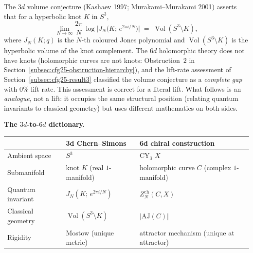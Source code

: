 The $3d$ volume conjecture (Kashaev 1997; Murakami--Murakami 2001) asserts that
for a hyperbolic knot $K$ in $S^3$,
\begin{equation}\label{eq:3d-volume-conjecture}
\lim_{N \to \infty} \frac{2\pi}{N}\,
 \log\bigl| J_N\!\bigl(K;\, e^{2\pi i / N}\bigr)\bigr|
 \;=\; \operatorname{Vol}(S^3 \setminus K),
\end{equation}
where $J_N(K; q)$ is the $N$-th coloured Jones polynomial and
$\operatorname{Vol}(S^3 \setminus K)$ is the hyperbolic volume of the
knot complement. The $6d$ holomorphic theory does not have knots
(holomorphic curves are not knots: Obstruction~$2$ in
Section~\ref{subsec:cfg25-obstruction-hierarchy}), and the lift-rate
assessment of Section~\ref{subsec:cfg25-result3} classified the volume
conjecture as a \emph{complete gap} with $0\%$ lift rate. This
assessment is correct for a literal lift. What follows is an
\emph{analogue}, not a lift: it occupies the same structural
position (relating quantum invariants to classical geometry) but
uses different mathematics on both sides.

\medskip\noindent\textbf{The $3d$-to-$6d$ dictionary.}
\begin{center}
\small
\renewcommand{\arraystretch}{1.2}
\begin{tabular}{lll}
\toprule
& \textbf{3d Chern--Simons} & \textbf{6d chiral construction} \\
\midrule
Ambient space & $S^3$ & CY$_3$ $X$ \\
Submanifold & knot $K$ (real $1$-manifold) & holomorphic curve $C$ (complex $1$-manifold) \\
Quantum invariant & $J_N(K;\, e^{2\pi i/N})$ & $Z_N^{\mathrm{ch}}(C, X)$ \\
Classical geometry & $\operatorname{Vol}(S^3 \setminus K)$ & $\lvert\mathrm{AJ}(C)\rvert$ \\
Rigidity & Mostow (unique metric) & attractor mechanism (unique at attractor) \\
\bottomrule
\end{tabular}
\end{center}

